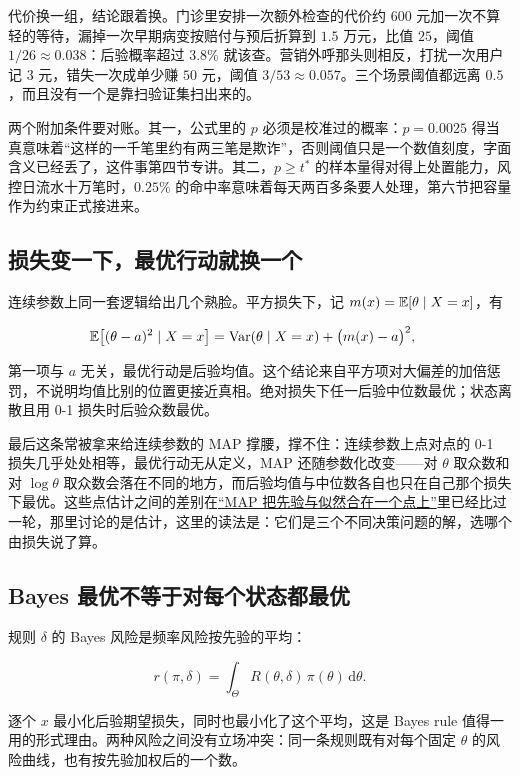 代价换一组，结论跟着换。门诊里安排一次额外检查的代价约 \(600\) 元加一次不算轻的等待，漏掉一次早期病变按赔付与预后折算到 \(1.5\) 万元，比值 \(25\)，阈值 \(1/26\approx 0.038\)：后验概率超过 \(3.8\%\) 就该查。营销外呼那头则相反，打扰一次用户记 \(3\) 元，错失一次成单少赚 \(50\) 元，阈值 \(3/53\approx 0.057\)。三个场景阈值都远离 \(0.5\)，而且没有一个是靠扫验证集扫出来的。

两个附加条件要对账。其一，公式里的 \(p\) 必须是校准过的概率：\(p=0.0025\) 得当真意味着``这样的一千笔里约有两三笔是欺诈''，否则阈值只是一个数值刻度，字面含义已经丢了，这件事第四节专讲。其二，\(p\ge t^\ast\) 的样本量得对得上处置能力，风控日流水十万笔时，\(0.25\%\) 的命中率意味着每天两百多条要人处理，第六节把容量作为约束正式接进来。

\subsection{损失变一下，最优行动就换一个}

连续参数上同一套逻辑给出几个熟脸。平方损失下，记 \(m(x)=\mathbb{E}[\theta\mid X=x]\)，有

\[
\begin{aligned}
\mathbb{E}\!\left[(\theta-a)^2\mid X=x\right]
&=\operatorname{Var}(\theta\mid X=x)+\bigl(m(x)-a\bigr)^2 ,
\end{aligned}
\]

第一项与 \(a\) 无关，最优行动是后验均值。这个结论来自平方项对大偏差的加倍惩罚，不说明均值比别的位置更接近真相。绝对损失下任一后验中位数最优；状态离散且用 0-1 损失时后验众数最优。

最后这条常被拿来给连续参数的 MAP 撑腰，撑不住：连续参数上点对点的 0-1 损失几乎处处相等，最优行动无从定义，MAP 还随参数化改变——对 \(\theta\) 取众数和对 \(\log\theta\) 取众数会落在不同的地方，而后验均值与中位数各自也只在自己那个损失下最优。这些点估计之间的差别在\hyperref[sec:11-Mathematical-Statistics/02-Point-Estimation/04]{``MAP 把先验与似然合在一个点上''}里已经比过一轮，那里讨论的是估计，这里的读法是：它们是三个不同决策问题的解，选哪个由损失说了算。

\subsection{Bayes 最优不等于对每个状态都最优}

规则 \(\delta\) 的 Bayes 风险是频率风险按先验的平均：

\[
r(\pi,\delta)=\int_\Theta R(\theta,\delta)\,\pi(\theta)\,\mathrm d\theta .
\]

逐个 \(x\) 最小化后验期望损失，同时也最小化了这个平均，这是 Bayes rule 值得一用的形式理由。两种风险之间没有立场冲突：同一条规则既有对每个固定 \(\theta\) 的风险曲线，也有按先验加权后的一个数。

